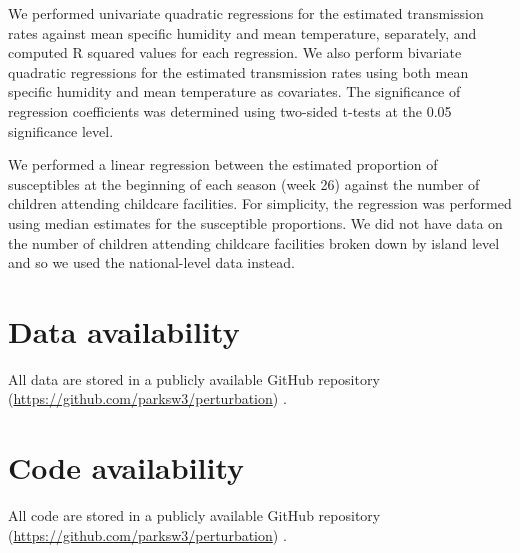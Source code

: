 \documentclass[12pt]{article}
\begin{document}
We performed univariate quadratic regressions for the estimated transmission rates against mean specific humidity and mean temperature, separately, and computed R squared values for each regression.
We also perform bivariate quadratic regressions for the estimated transmission rates using both mean specific humidity and mean temperature as covariates.
The significance of regression coefficients was determined using two-sided t-tests at the 0.05 significance level.

We performed a linear regression between the estimated proportion of susceptibles at the beginning of each season (week 26) against the number of children attending childcare facilities.
For simplicity, the regression was performed using median estimates for the susceptible proportions.
We did not have data on the number of children attending childcare facilities broken down by island level and so we used the national-level data instead.

\section*{Data availability}

All data are stored in a publicly available GitHub repository (\url{https://github.com/parksw3/perturbation}) \citep{perturbationzenodo}.

\section*{Code availability}

All code are stored in a publicly available GitHub repository (\url{https://github.com/parksw3/perturbation}) \citep{perturbationzenodo}.
\end{document}
